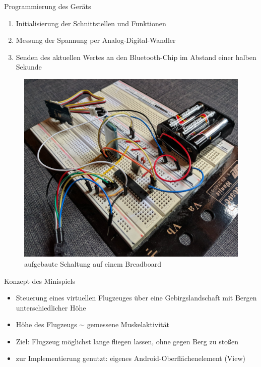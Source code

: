 \documentclass[final,20pt]{beamer}
\newlength{\colwidth}
\begin{document}
\begin{frame}[t]
\begin{columns}[t]
\begin{column}{\colwidth}
  \begin{alertblock}{Programmierung des Geräts}
  	\begin{large}
  	\begin{enumerate}
  		\item Initialisierung der Schnittstellen und Funktionen
  		\item Messung der Spannung per Analog-Digital-Wandler
  		\item Senden des aktuellen Wertes an den Bluetooth-Chip im Abstand einer halben Sekunde
  	\end{enumerate}
\end{large}
\vspace*{1cm}
	  \begin{figure}[H]
	  	\centering
	  	\includegraphics[width=0.8\colwidth]{pics/mikrocontroller}
	  	\caption{aufgebaute Schaltung auf einem Breadboard}
	  	\label{fig:mcspp}
	  \end{figure}
  \end{alertblock}



\begin{alertblock}{Konzept des Minispiels}
	\begin{itemize}
		\item Steuerung eines virtuellen Flugzeuges über eine Gebirgslandschaft mit Bergen unterschiedlicher Höhe
		\item Höhe des Flugzeugs $\sim$ gemessene Muskelaktivität
		\item Ziel: Flugzeug möglichst lange fliegen lassen, ohne gegen Berg zu stoßen
		\item zur Implementierung genutzt: eigenes Android-Oberflächenelement (View)
	\end{itemize}
\end{alertblock}
\end{column}


\end{columns}
\end{frame}
\end{document}
